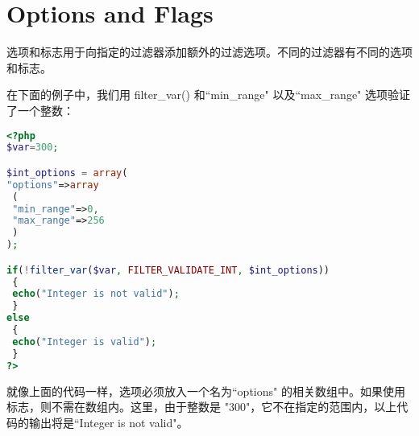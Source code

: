 \section{Options and Flags}


选项和标志用于向指定的过滤器添加额外的过滤选项。不同的过滤器有不同的选项和标志。


在下面的例子中，我们用 filter\_var() 和``min\_range" 以及``max\_range" 选项验证了一个整数：

\begin{lstlisting}[language=PHP]
<?php
$var=300;

$int_options = array(
"options"=>array
 (
 "min_range"=>0,
 "max_range"=>256
 )
);

if(!filter_var($var, FILTER_VALIDATE_INT, $int_options))
 {
 echo("Integer is not valid");
 }
else
 {
 echo("Integer is valid");
 }
?>
\end{lstlisting}

就像上面的代码一样，选项必须放入一个名为``options" 的相关数组中。如果使用标志，则不需在数组内。这里，由于整数是 "300"，它不在指定的范围内，以上代码的输出将是``Integer is not valid"。






